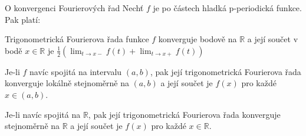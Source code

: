 \begin{vetaN}{O konvergenci Fourierových řad}
Nechť $f$ je po částech hladká p-periodická funkce. Pak platí:
\begin{penumerate}
	\item Trigonometrická Fourierova řada funkce $f$ konverguje bodově na $\mathbb{R}$ a její součet v bodě $x \in \mathbb{R}$ je $\frac{1}{2} \left( \lim_{t\rightarrow x-} f(t) + \lim_{t\rightarrow x+} f(t)\right)$
	\item Je-li $f$ navíc spojitá na intervalu $(a,b)$, pak její trigonometrická Fourierova řada konverguje lokálně stejnoměrně na $(a,b)$ a její součet je $f(x)$ pro každé $x \in (a,b)$.
	\item Je-li navíc spojitá na $\mathbb{R}$, pak její trigonometrická Fourierova řada konverguje stejnoměrně na $\mathbb{R}$ a její součet je $f(x)$ pro každé $x \in \mathbb{R}$.
\end{penumerate}
\end{vetaN}


